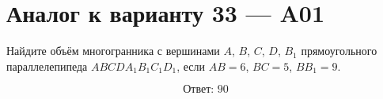 \documentclass[12pt,a4paper]{article}
\begin{document}
\section*{Аналог к варианту 33 — A01}

Найдите объём многогранника с вершинами \(A\), \(B\), \(C\), \(D\), \(B_1\) прямоугольного параллелепипеда \(ABCDA_1B_1C_1D_1\), если \(AB=6\), \(BC=5\), \(BB_1=9\).

\begin{center}
\end{center}

\[
\boxed{\text{Ответ: }90}
\]
\end{document}
